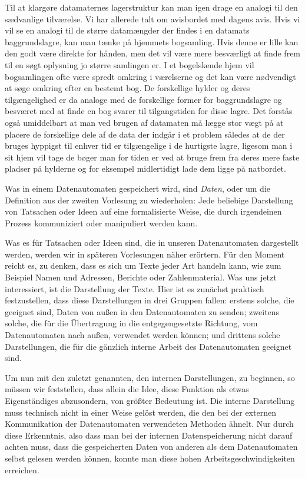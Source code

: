 {Til at klargøre datamaternes lagerstruktur kan man igen drage en analogi til den sædvanlige tilværelse. Vi har allerede talt om avisbordet med dagens avis. Hvis vi vil se en analogi til de større datamængder der findes i en datamats baggrundslagre, kan man tænke på hjemmets bogsamling. Hvis denne er lille kan den godt være direkte for hånden, men det vil være mere besværligt at finde frem til en søgt oplysning jo større samlingen er. I et bogelskende hjem vil bogsamlingen ofte være spredt omkring i værelserne og det kan være nødvendigt at søge omkring efter en bestemt bog. De forskellige hylder og deres tilgængelighed er da analoge med de forskellige former for baggrundslagre og besværet med at finde en bog svarer til tilgangstiden for disse lagre. Det forstås også umiddelbart at man ved brugen af datamaten må lægge stor vægt på at placere de forskellige dele af de data der indgår i et problem således at de der bruges hyppigst til enhver tid er tilgængelige i de hurtigste lagre, ligesom man i sit hjem vil tage de bøger man for tiden er ved at bruge frem fra deres mere faste pladser på hylderne og for eksempel midlertidigt lade dem ligge på natbordet.
}{
Was in einem Datenautomaten gespeichert wird, sind \emph{Daten}, oder um die Definition aus der zweiten Vorlesung zu wiederholen: Jede beliebige Darstellung von Tatsachen oder Ideen auf eine formalisierte Weise, die durch irgendeinen Prozess kommuniziert oder manipuliert werden kann.

Was es für Tatsachen oder Ideen sind, die in unseren Datenautomaten dargestellt werden, werden wir in späteren Vorlesungen näher erörtern. Für den Moment reicht es, zu denken, dass es sich um Texte jeder Art handeln kann, wie zum Beispiel Namen und Adressen, Berichte oder Zahlenmaterial. Was uns jetzt interessiert, ist die Darstellung der Texte. Hier ist es zunächst praktisch festzustellen, dass diese Darstellungen in drei Gruppen fallen: erstens solche, die geeignet sind, Daten von außen in den Datenautomaten zu senden; zweitens solche, die für die Übertragung in die entgegengesetzte Richtung, vom Datenautomaten nach außen, verwendet werden können; und drittens solche Darstellungen, die für die gänzlich interne Arbeit des Datenautomaten geeignet sind.

Um nun mit den zuletzt genannten, den internen Darstellungen, zu beginnen, so müssen wir feststellen, dass allein die Idee, diese Funktion als etwas Eigenständiges abzusondern, von größter Bedeutung ist. Die interne Darstellung muss technisch nicht in einer Weise gelöst werden, die den bei der externen Kommunikation der Datenautomaten verwendeten Methoden ähnelt. Nur durch diese Erkenntnis, also dass man bei der internen Datenspeicherung nicht darauf achten muss, dass die gespeicherten Daten von anderen als dem Datenautomaten selbst gelesen werden können, konnte man diese hohen Arbeitsgeschwindigkeiten erreichen.

}
